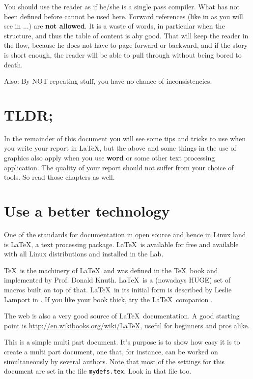 You should use the reader as if he/she is a single pass compiler. What has not been defined before cannot be used here. Forward references (like in as you will see in ...) are \textbf{not allowed}. It is a waste of words, in particular when the structure, and thus the table of content is aby good.
That will keep the reader in the flow, because he does not have to page forward or backward, and if the story is short enough, the reader will be able to pull through without being bored to death.

Also: By NOT repeating stuff, you have no chance of inconsistencies.

\section{TLDR;}

In the remainder of this document you will see some tips and tricks to use when you write your report in \LaTeX,
but the above and some things in the use of graphics also apply when you use \textbf{word} or some other text processing application. The quality of your report should not suffer from your choice of tools.
So read those chapters as well.

\section{Use a better technology}
One of the standards for documentation in open source and hence in
Linux land is \LaTeX, a text processing package. \LaTeX\ is available
for free and available with all Linux distributions and installed in
the Lab.

\TeX\ is the machinery of \LaTeX\ and was defined in the \TeX\ book
\cite{texbook} and implemented by
Prof. Donald Knuth. \LaTeX\ is a (nowadays HUGE) set of macros built
on top of that. \LaTeX\ in its initial form is described by Leslie
Lamport in \cite{latexbook}. If you like your book thick, try the
\LaTeX\ companion \cite{latexcompanion}.

The web is also a very good source of \LaTeX\ documentation. A good
starting point is \url{http://en.wikibooks.org/wiki/LaTeX}, useful for
beginners and pros alike.

This is a simple multi part document. It's purpose is to show how easy it is
to create a multi part document, one that, for instance, can be worked on 
simultaneously by several authors. Note that most of the settings for
this document are set in the file \texttt{mydefs.tex}. 
Look in that file too.


